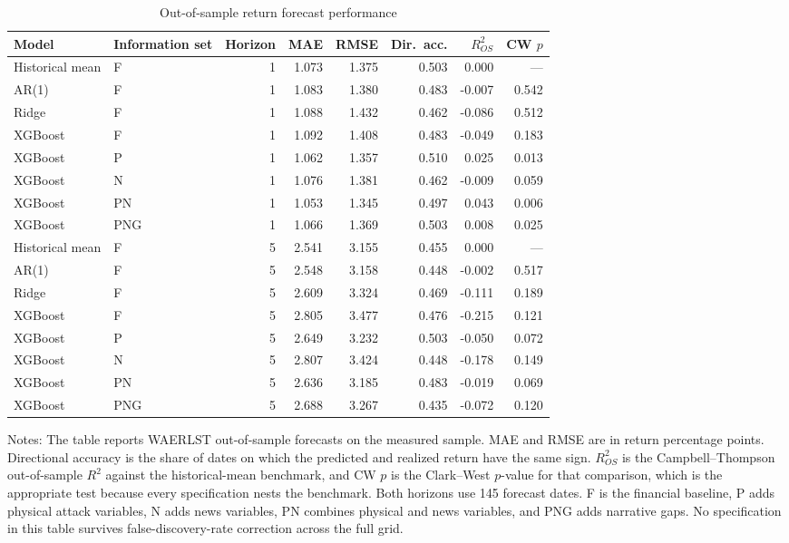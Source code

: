 \documentclass[12pt,a4paper]{article}
\begin{document}
\begin{table}[H]
\centering
\caption{Out-of-sample return forecast performance}
\label{tab:return_forecasts}
\begin{threeparttable}
\begin{tabular}{llrrrrrr}
\toprule
Model & Information set & Horizon & MAE & RMSE & Dir.\ acc. & $R^2_{OS}$ & CW $p$ \\
\midrule
Historical mean & F & 1 & 1.073 & 1.375 & 0.503 & 0.000 & --- \\
AR(1) & F & 1 & 1.083 & 1.380 & 0.483 & -0.007 & 0.542 \\
Ridge & F & 1 & 1.088 & 1.432 & 0.462 & -0.086 & 0.512 \\
XGBoost & F & 1 & 1.092 & 1.408 & 0.483 & -0.049 & 0.183 \\
XGBoost & P & 1 & 1.062 & 1.357 & 0.510 & 0.025 & 0.013 \\
XGBoost & N & 1 & 1.076 & 1.381 & 0.462 & -0.009 & 0.059 \\
XGBoost & PN & 1 & 1.053 & 1.345 & 0.497 & 0.043 & 0.006 \\
XGBoost & PNG & 1 & 1.066 & 1.369 & 0.503 & 0.008 & 0.025 \\
\addlinespace
Historical mean & F & 5 & 2.541 & 3.155 & 0.455 & 0.000 & --- \\
AR(1) & F & 5 & 2.548 & 3.158 & 0.448 & -0.002 & 0.517 \\
Ridge & F & 5 & 2.609 & 3.324 & 0.469 & -0.111 & 0.189 \\
XGBoost & F & 5 & 2.805 & 3.477 & 0.476 & -0.215 & 0.121 \\
XGBoost & P & 5 & 2.649 & 3.232 & 0.503 & -0.050 & 0.072 \\
XGBoost & N & 5 & 2.807 & 3.424 & 0.448 & -0.178 & 0.149 \\
XGBoost & PN & 5 & 2.636 & 3.185 & 0.483 & -0.019 & 0.069 \\
XGBoost & PNG & 5 & 2.688 & 3.267 & 0.435 & -0.072 & 0.120 \\
\bottomrule
\end{tabular}
\begin{tablenotes}
\small
\item Notes: The table reports WAERLST out-of-sample forecasts on the measured sample. MAE and RMSE are in return percentage points. Directional accuracy is the share of dates on which the predicted and realized return have the same sign. $R^2_{OS}$ is the Campbell--Thompson out-of-sample $R^2$ against the historical-mean benchmark, and CW $p$ is the Clark--West $p$-value for that comparison, which is the appropriate test because every specification nests the benchmark. Both horizons use 145 forecast dates. F is the financial baseline, P adds physical attack variables, N adds news variables, PN combines physical and news variables, and PNG adds narrative gaps. No specification in this table survives false-discovery-rate correction across the full grid.
\end{tablenotes}
\end{threeparttable}
\end{table}
\end{document}
